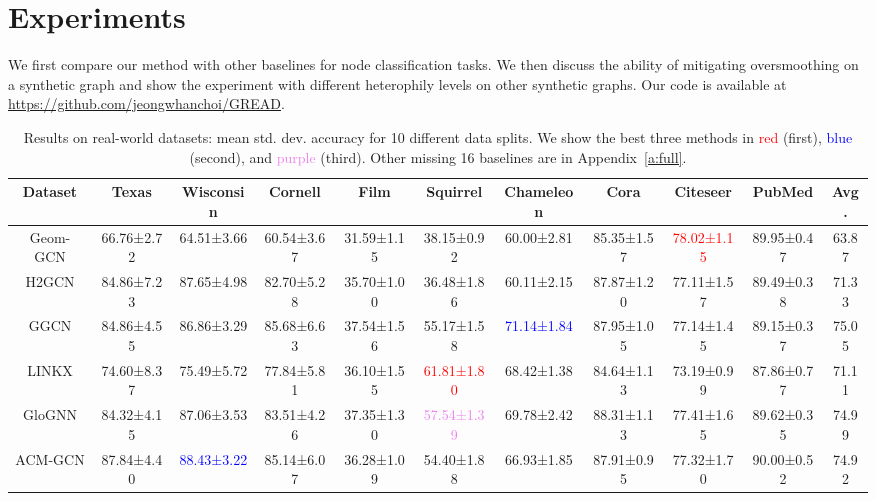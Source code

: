 \documentclass{article}
\theoremstyle{plain}
\theoremstyle{definition}
\theoremstyle{remark}
\newcommand{\std}{\scriptsize{}}
\newcommand{\BEST}[1]{\textcolor{red}{#1}}
\newcommand{\SECOND}[1]{\textcolor{blue}{#1}}
\newcommand{\THIRD}[1]{\textcolor{violet}{#1}}
\begin{document}
\section{Experiments}
We first compare our method with other baselines for node classification tasks. We then discuss the ability of mitigating oversmoothing on a synthetic graph and show the experiment with different heterophily levels on other synthetic graphs. Our code is available at \url{https://github.com/jeongwhanchoi/GREAD}.

\begin{table*}[ht]
    \small
    \centering
    \setlength{\tabcolsep}{2pt}
    \caption{Results on real-world datasets: mean  std. dev. accuracy for 10 different data splits. We show the best three methods in \BEST{red} (first), \SECOND{blue} (second), and \THIRD{purple} (third). Other missing 16 baselines are in Appendix~\ref{a:full}.}
\begin{tabular}{c ccccccccc c}\toprule
        Dataset     & Texas      & Wisconsin  & Cornell    & Film       & Squirrel   & Chameleon  & Cora       & Citeseer   & PubMed & Avg.\\ \midrule
Geom-GCN	& 66.76\std{±2.72} & 64.51\std{±3.66} & 60.54\std{±3.67} & 31.59\std{±1.15} & 38.15\std{±0.92} & 60.00\std{±2.81} & 85.35\std{±1.57} & \BEST{78.02\std{±1.15}} & 89.95\std{±0.47} & 63.87\\
        H2GCN	    & 84.86\std{±7.23} & 87.65\std{±4.98} & 82.70\std{±5.28} & 35.70\std{±1.00} & 36.48\std{±1.86} & 60.11\std{±2.15} & 87.87\std{±1.20} & 77.11\std{±1.57} & 89.49\std{±0.38} & 71.33\\
GGCN        & 84.86\std{±4.55} & 86.86\std{±3.29} & 85.68\std{±6.63} & 37.54\std{±1.56} & 55.17\std{±1.58} & \SECOND{71.14\std{±1.84}} & 87.95\std{±1.05} & 77.14\std{±1.45} & 89.15\std{±0.37} & 75.05\\
        LINKX       & 74.60\std{±8.37} & 75.49\std{±5.72} & 77.84\std{±5.81} & 36.10\std{±1.55} & \BEST{61.81\std{±1.80}} & 68.42\std{±1.38} & 84.64\std{±1.13} & 73.19\std{±0.99} & 87.86\std{±0.77} & 71.11\\
        GloGNN      & 84.32\std{±4.15} & 87.06\std{±3.53} & 83.51\std{±4.26} & 37.35\std{±1.30} & \THIRD{57.54\std{±1.39}} & 69.78\std{±2.42} & 88.31\std{±1.13} & 77.41\std{±1.65} & 89.62\std{±0.35} & 74.99\\
        ACM-GCN	    & 87.84\std{±4.40} & \SECOND{88.43\std{±3.22}} & 85.14\std{±6.07} & 36.28\std{±1.09} & 54.40\std{±1.88} & 66.93\std{±1.85} & 87.91\std{±0.95} & 77.32\std{±1.70} & 90.00\std{±0.52} & 74.92\\

\end{tabular}
\end{table*}
\end{document}
